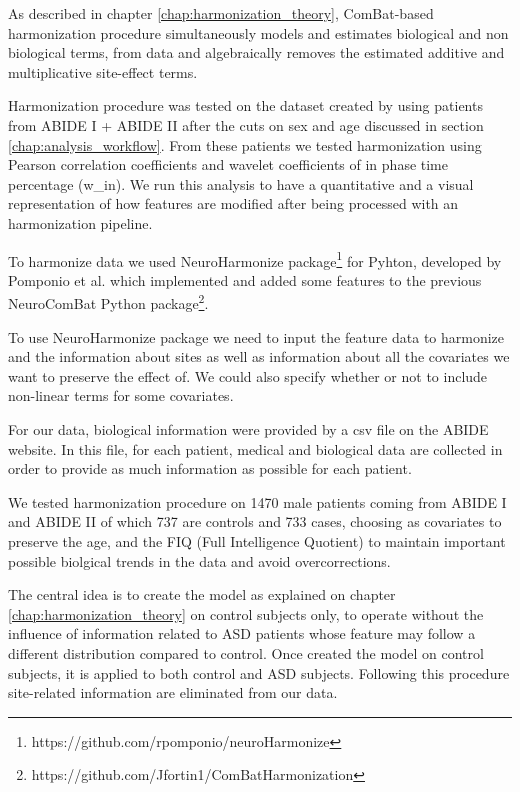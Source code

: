 \documentclass[11pt]{report}
\begin{document}
As described in chapter \ref{chap:harmonization_theory}, ComBat-based harmonization procedure simultaneously models and estimates biological and non biological terms, from data and algebraically removes the estimated additive and multiplicative site-effect terms.

Harmonization procedure was tested on the dataset created by using patients from ABIDE I + ABIDE II after the cuts on sex and age discussed in section \ref{chap:analysis_workflow}.
From these patients we tested harmonization using Pearson correlation coefficients and wavelet coefficients of in phase time percentage (w\_in).
We run this analysis to have a quantitative and a visual representation of how features are modified after being processed with an harmonization pipeline.

To harmonize data we used NeuroHarmonize package\footnote{https://github.com/rpomponio/neuroHarmonize} for Pyhton, developed by Pomponio et al. \cite{pomponio-2019} which implemented and added some features to the previous NeuroComBat Python package\footnote{https://github.com/Jfortin1/ComBatHarmonization}.

To use NeuroHarmonize package we need to input the feature data to harmonize and the information about sites as well as information about all the covariates we want to preserve the effect of.
We could also specify whether or not to include non-linear terms for some covariates.

For our data, biological information were provided by a csv file on the ABIDE website. 
In this file, for each patient, medical and biological data are collected in order to provide as much information as possible for each patient.

We tested harmonization procedure on 1470 male patients coming from ABIDE I and ABIDE II of which 737 are controls and 733 cases, choosing as covariates to preserve the age, and the FIQ (Full Intelligence Quotient) to maintain important possible biolgical trends in the data and avoid overcorrections.

The central idea is to create the model as explained on chapter \ref{chap:harmonization_theory} on control subjects only, to operate without the influence of information related to ASD patients whose feature may follow a different distribution compared to control.
Once created the model on control subjects, it is applied to both control and ASD subjects. 
Following this procedure site-related information are eliminated from our data.
\end{document}
